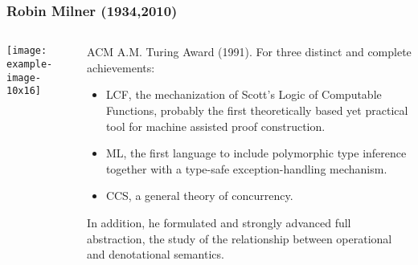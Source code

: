 \documentclass{beamer}
\begin{document}
\begin{frame}
    \frametitle{Robin Milner (1934,2010)}
    \scriptsize
    \begin{columns}[onlytextwidth, T]
        \begin{column}{.48\textwidth}
            \texttt{[image: example-image-10x16]}
        \end{column}
        \begin{column}{.48\textwidth}
            ACM A.M. Turing Award (1991). For three distinct and complete achievements:
            \begin{itemize}
                \item LCF, the mechanization of Scott's Logic of Computable Functions, probably the first theoretically based yet practical tool for machine assisted proof construction.
                \item ML, the first language to include polymorphic type inference together with a type-safe exception-handling mechanism.
                \item CCS, a general theory of concurrency.
            \end{itemize}
            In addition, he formulated and strongly advanced full abstraction, the study of the relationship between operational and denotational semantics.
        \end{column}
    \end{columns}
\end{frame}
\end{document}

